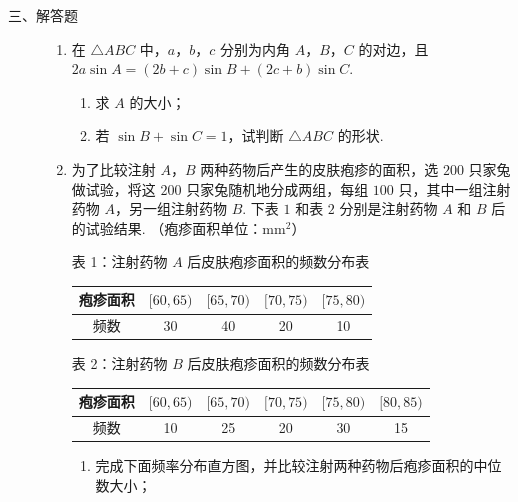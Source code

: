 \begin{description}

    \item[三、解答题]

    \begin{enumerate}[leftmargin=5pt]

      \addtocounter{enumi}{+16}

        \item 在 \(\triangle ABC\) 中，\(a\)，\(b\)，\(c\) 分别为内角 \(A\)，\(B\)，\(C\) 的对边，且 \(2a\sin A=(2b+c)\sin B+(2c+b)\sin C\).

\begin{enumerate}
\item 求 \(A\) 的大小；
\item 若 \(\sin B+\sin C=1\)，试判断 \(\triangle ABC\) 的形状.
\end{enumerate}

        \item 为了比较注射 \(A\)，\(B\) 两种药物后产生的皮肤疱疹的面积，选 \(200\) 只家兔做试验，将这 \(200\) 只家兔随机地分成两组，每组 \(100\) 只，其中一组注射药物 \(A\)，另一组注射药物 \(B\). 下表 \(1\) 和表 \(2\) 分别是注射药物 \(A\) 和 \(B\) 后的试验结果. （疱疹面积单位：\(\mathrm{mm}^2\)）

\begin{center}
表 1：注射药物 \(A\) 后皮肤疱疹面积的频数分布表

\begin{tabular}{|c|c|c|c|c|}
\hline
疱疹面积 & \([60,65)\) & \([65,70)\) & \([70,75)\) & \([75,80)\) \\
\hline
频数 & 30 & 40 & 20 & 10 \\
\hline
\end{tabular}
\end{center}

\begin{center}
表 2：注射药物 \(B\) 后皮肤疱疹面积的频数分布表

\begin{tabular}{|c|c|c|c|c|c|}
\hline
疱疹面积 & \([60,65)\) & \([65,70)\) & \([70,75)\) & \([75,80)\) & \([80,85)\) \\
\hline
频数 & 10 & 25 & 20 & 30 & 15 \\
\hline
\end{tabular}
\end{center}

\begin{enumerate}
\item 完成下面频率分布直方图，并比较注射两种药物后疱疹面积的中位数大小；


\end{enumerate}
\end{enumerate}
\end{description}
